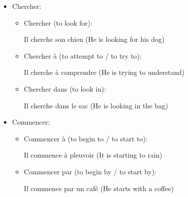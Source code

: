 \documentclass{book}
\begin{document}
\begin{itemize}
\begin{itemize}
                    \item Arriver de + location (to arrive from  + location):
                        \begin{center}
                            Il est arrivé de Paris (He arrived from Paris)
                        \end{center}
                \end{itemize}
            
            \item Chercher:
                \begin{itemize}
                    \item Chercher (to look for):
                        \begin{center}
                            Il cherche son chien (He is looking for his dog)
                        \end{center}
                    
                    \item Chercher à (to attempt to / to try to):
                        \begin{center}
                            Il cherche à comprendre (He is trying to understand)
                        \end{center}
                        
                    \item Chercher dans (to look in):
                        \begin{center}
                            Il cherche dans le sac (He is looking in the bag)
                        \end{center}
                \end{itemize}

            \item Commencer:
                \begin{itemize}
                    \item Commencer à (to begin to / to start to):
                        \begin{center}
                            Il commence à pleuvoir (It is starting to rain)
                        \end{center}
                    
                    \item Commencer par (to begin by / to start by):
                        \begin{center}
                            Il commence par un café (He starts with a coffee)
                        \end{center}
                \end{itemize}


\end{itemize}
\end{document}
